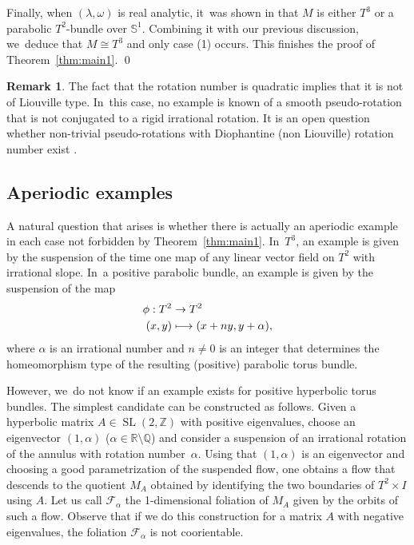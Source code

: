 \documentclass[10pt]{amsart}
\newcommand\mto{\mathchoice{\longmapsto}{\mapsto}{\mapsto}{\mapsto}}
\theoremstyle{definition}
\newtheorem{Remark}[theorem]{Remark}
\newcommand{\mS}{\mathbb{S}}
\begin{document}
Finally, when $(\lambda,\omega)$ is real analytic, it~was shown in \cite[\S 4]{Re} that $M$ is either $T^3$ or a parabolic $T^2$-bundle over $\mS^1$. Combining it with our previous discussion, we~deduce that $M\cong T^3$ and only case (1) occurs. This finishes the proof of Theorem~\ref{thm:main1}.
\hfill \qed

\begin{Remark}\label{rem: pseudo-rotation}
The fact that the rotation number is quadratic implies that it is not of Liouville type. In~this case, no example is known of a smooth pseudo-rotation that is not conjugated to a rigid irrational rotation. It is an open question whether non-trivial pseudo-rotations with Diophantine (\ie non Liouville) rotation number exist \cite{FK}.
\end{Remark}

\subsection{Aperiodic examples}
A natural question that arises is whether there is actually an aperiodic example in each case not forbidden by Theorem~\ref{thm:main1}. In~$T^3$, an example is given by the suspension of the time one map of any linear vector field on $T^2$ with irrational slope. In~a positive parabolic bundle, an example is given by the suspension of the map
\begin{align*}
\phi: T^2 &\to T^2\\
	 (x,y) &\mto (x+ny,y+\alpha),
\end{align*}
where $\alpha$ is an irrational number and $n\neq 0$ is an integer that determines the homeomorphism type of the resulting (positive) parabolic torus bundle.

However, we~do not know if an example exists for positive hyperbolic torus bundles. The simplest candidate can be constructed as follows. Given a hyperbolic matrix $A\in \operatorname{SL}(2,\mathbb{Z})$ with positive eigenvalues, choose an eigenvector $(1,\alpha)$
($\alpha \in \mathbb{R}\setminus \mathbb{Q}$) and consider a suspension of an irrational rotation of the annulus with rotation number~$\alpha$. Using that $(1,\alpha)$ is an eigenvector and choosing a good parametrization of the suspended flow, one obtains a flow that descends to the quotient $M_A$ obtained by identifying the two boundaries of $T^2\times I$ using $A$. Let us call $\mathcal{F}_\alpha$ the 1-dimensional foliation of $M_A$ given by the orbits of such a flow. Observe that if we do this construction for a matrix $A$ with negative eigenvalues, the foliation $\mathcal{F}_\alpha$ is not coorientable.
\end{document}

